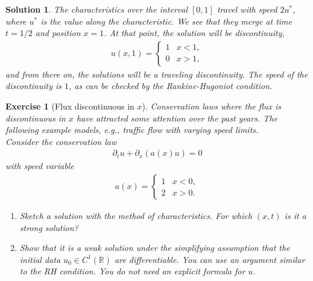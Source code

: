 \documentclass[10pt,letterpaper]{article}
\theoremstyle{break}
\newtheorem{exercise}{Exercise}
\newtheorem{mysolution}{Solution}
\newenvironment{solution}{\begin{mysolution}}{\end{mysolution}}
\begin{document}
\begin{solution}
    The characteristics over the interval $[0,1]$ travel with speed $2u^{\ast}$, where $u^{\ast}$ is the value along the characteristic.
    We see that they merge at time $t=1/2$ and position $x=1$. At that point, the solution will be discontinuity,
    \begin{align}
     u(x,1)
     = 
     \left\{
     \begin{array}{cc}
        1 & x < 1,
        \\
        0 & x > 1,
     \end{array}
     \right.
    \end{align}
    and from there on, the solutions will be a traveling discontinuity. The speed of the discontinuity is $1$, as can be checked by the Rankine-Hugoniot condition.
\end{solution}



\begin{exercise}[Flux discontinuous in $x$]

    \textit{Conservation laws where the flux is discontinuous in $x$ have attracted some attention over the past years. The following example models, e.g., traffic flow with varying speed limits.}
    \\
    
    \noindent 
    Consider the conservation law 
    \begin{align}
     \partial_t u + \partial_x\left( a(x) u \right) = 0
    \end{align}
    with speed variable 
    \begin{align}
     a(x)
     = 
     \left\{
     \begin{array}{cc}
        1 & x < 0,
        \\
        2 & x > 0.
     \end{array}
     \right.
    \end{align}
    \begin{enumerate}
        \item
        Sketch a solution with the method of characteristics.
        For which $(x,t)$ is it a strong solution?
        \item
        Show that it is a weak solution under the simplifying assumption that the initial data $u_0 \in C^{1}(\mathbb R)$ are differentiable. 
        \textit{You can use an argument similar to the RH condition. You do not need an explicit formula for $u$.}
    \end{enumerate}
\end{exercise}
\end{document}
